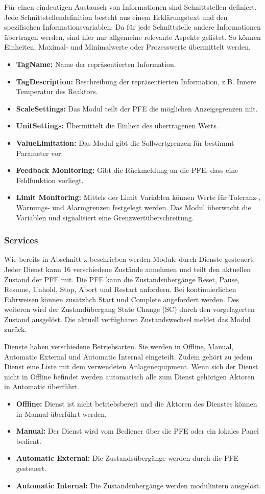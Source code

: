 Für einen eindeutigen Austausch von Informationen sind Schnittstellen definiert. Jede Schnittstellendefinition besteht aus einem Erklärungstext und den spezifischen Informationsvariablen. Da für jede Schnittstelle andere Informationen übertragen werden, sind hier nur allgemeine relevante Aspekte gelistet. So können Einheiten, Maximal- und Minimalwerte oder Prozesswerte übermittelt werden.
\begin{itemize}
\item \textbf{TagName:} Name der repräsentierten Information. 
\item \textbf{TagDescription:} Beschreibung der repräsentierten Information, z.B. Innere Temperatur des Reaktors.
\item \textbf{ScaleSettings:} Das Modul teilt der PFE die möglichen Anzeigegrenzen mit.
\item \textbf{UnitSettings:} Übermittelt die Einheit des übertragenen Werts.
\item \textbf{ValueLimitation:} Das Modul gibt die Sollwertgrenzen für bestimmt Parameter vor.
\item \textbf{Feedback Monitoring:} Gibt die Rückmeldung an die PFE, dass eine Fehlfunktion vorliegt.
\item \textbf{Limit Monitoring:} Mittels der Limit Variablen können Werte für Toleranz-, Warnungs- und Alarmgrenzen festgelegt werden. Das Modul überwacht die Variablen und signalisiert eine Grenzwertüberschreitung.
\end{itemize}

\subsubsection*{Services}
Wie bereits in Abschnitt x beschrieben werden Module durch Dienste gesteuert. Jeder Dienst kann 16 verschiedene Zustände annehmen und teilt den aktuellen Zustand der PFE mit. Die PFE kann die Zustandsübergänge Reset, Pause, Resume, Unhold, Stop, Abort und Restart anfordern. Bei kontinuierlichen Fahrweisen können zusätzlich Start und Complete angefordert werden. Des weiteren wird der Zustandübergang State Change (SC) durch den vorgelagerten Zustand ausgelöst.  Die aktuell verfügbaren Zustandswechsel meldet das Modul zurück.

Dienste haben verschiedene Betriebsarten. Sie werden in Offline, Manual, Automatic External und Automatic Internal eingeteilt. Zudem gehört zu jedem Dienst eine Liste mit dem verwendeten Anlagenequipment. Wenn sich der Dienst nicht in Offline befindet werden automatisch alle zum Dienst gehörigen Aktoren in Automatic überführt.
\begin{itemize}
\item \textbf{Offline:} Dienst ist nicht betriebsbereit und die Aktoren des Dienstes können in Manual überführt werden.
\item \textbf{Manual:} Der Dienst wird vom Bediener über die PFE oder ein lokales Panel bedient.
\item \textbf{Automatic External:} Die Zustandsübergänge werden durch die PFE gesteuert.
\item \textbf{Automatic Internal:} Die Zustandsübergänge werden modulintern ausgelöst.
\end{itemize}

